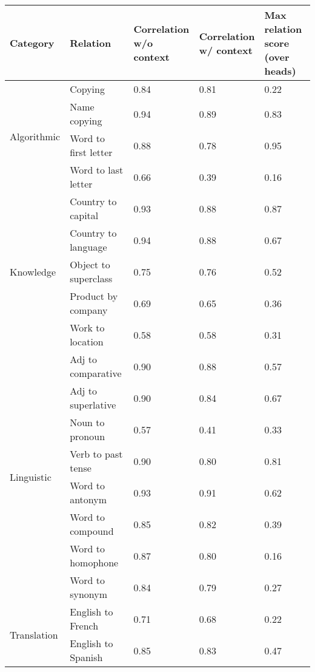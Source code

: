 \begin{tabular}{lllll}
\toprule
Category & Relation & \makecell{Correlation\\w/o context} & \makecell{Correlation\\w/ context} & \makecell{Max relation score\\(over heads)} \\
\midrule
\multirow{4}{*}{Algorithmic} & Copying & 0.84 & 0.81 & 0.22 \\
 & Name copying & 0.94 & 0.89 & 0.83 \\
 & Word to first letter & 0.88 & 0.78 & 0.95 \\
 & Word to last letter & 0.66 & 0.39 & 0.16 \\
 \midrule
\multirow{5}{*}{Knowledge} & Country to capital & 0.93 & 0.88 & 0.87 \\
 & Country to language & 0.94 & 0.88 & 0.67 \\
 & Object to superclass & 0.75 & 0.76 & 0.52 \\
 & Product by company & 0.69 & 0.65 & 0.36 \\
 & Work to location & 0.58 & 0.58 & 0.31 \\
 \midrule
\multirow{8}{*}{Linguistic} & Adj to comparative & 0.90 & 0.88 & 0.57 \\
 & Adj to superlative & 0.90 & 0.84 & 0.67 \\
 & Noun to pronoun & 0.57 & 0.41 & 0.33 \\
 & Verb to past tense & 0.90 & 0.80 & 0.81 \\
 & Word to antonym & 0.93 & 0.91 & 0.62 \\
 & Word to compound & 0.85 & 0.82 & 0.39 \\
 & Word to homophone & 0.87 & 0.80 & 0.16 \\
 & Word to synonym & 0.84 & 0.79 & 0.27 \\
 \midrule
\multirow{2}{*}{Translation} & English to French & 0.71 & 0.68 & 0.22 \\
 & English to Spanish & 0.85 & 0.83 & 0.47 \\
\bottomrule
\end{tabular}
